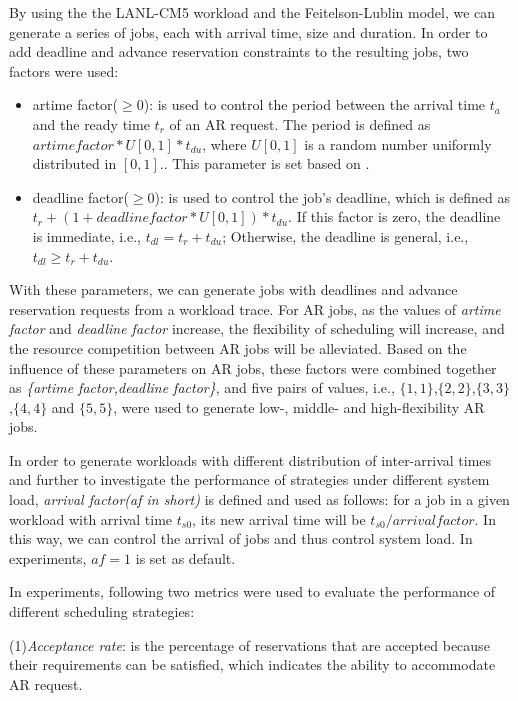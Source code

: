 \documentclass[preprint,12pt]{elsarticle}
\begin{document}
By using the the LANL-CM5 workload and the Feitelson-Lublin model, we can generate a series of jobs, each with arrival time, size and duration. In order to add deadline and advance reservation constraints to the resulting jobs, two factors were used:

\begin{itemize}
\item{artime factor($\ge 0$): is used to control the period between the arrival time $t_a$ and the ready time $t_r$ of an AR request. The period is defined as $artime factor*U[0,1]*t_{du}$, where $U[0,1]$ is a random number uniformly distributed in $[0,1]$.}. This parameter is set based on \cite{heine2005}.
\item{deadline factor($\ge 0$): is used to control the job's deadline, which is defined as $t_r+(1+deadline factor*U[0,1])*t_{du}$. If this factor is zero, the deadline is immediate, i.e., $t_{dl} = t_r+t_{du}$; Otherwise, the deadline is general, i.e., $t_{dl} \ge t_r+t_{du}$.}
\end{itemize}

With these parameters, we can generate jobs with deadlines and advance reservation requests from a workload trace. For AR jobs, as the values of \emph{artime factor} and \emph{deadline factor} increase, the flexibility of scheduling will increase, and the resource competition between AR jobs will be alleviated. Based on the influence of these parameters on AR jobs, these factors were combined together as \emph{\{artime factor,deadline factor\}}, and five pairs of values, i.e., $\{1,1\}$,$\{2,2\}$,$\{3,3\}$,$\{4,4\}$ and $\{5,5\}$, were used to generate low-, middle- and high-flexibility AR jobs.


In order to generate workloads with different distribution of inter-arrival times and further to investigate the performance of strategies under different system load, \emph{arrival factor(af in short)} is defined and used as follows: for a job in a given workload with arrival time $t_{s0}$, its new arrival time will be $t_{s0}/arrival factor$. In this way, we can control the arrival of jobs and thus control system load. In experiments, $af=1$ is set as default.


In experiments, following two metrics were used to evaluate the performance of different scheduling strategies:

(1)\emph{Acceptance rate}: is the percentage of reservations that are accepted because their requirements can be satisfied, which indicates the ability to accommodate AR request.
\end{document}
